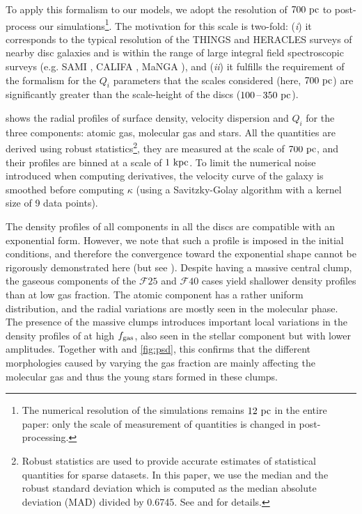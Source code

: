 \documentclass[useAMS,usenatbib]{mnras}
\newcommand{\fgas}{\ensuremath{f_{\rm gas}}\xspace}
\newcommand{\gm}{\ensuremath{\mathcal{F}25}\xspace}
\newcommand{\gl}{\ensuremath{\mathcal{F}40}\xspace}
\begin{document}
To apply this formalism to our models, we adopt the resolution of $700 \mathrm{~pc}$ to post-process our simulations\footnote{The numerical resolution of the simulations remains $12 \mathrm{~pc}$ in the entire paper: only the scale of measurement of quantities is changed in post-processing.}. The motivation for this scale is two-fold: (\emph{i}) it corresponds to the typical resolution of the THINGS and HERACLES surveys of nearby disc galaxies \citep{Walter2008, Leroy2009} and is within the range of large integral field spectroscopic surveys (e.g. SAMI \citealt{Croom2012}, CALIFA \citealt{Sanchez2012}, MaNGA \citealt{Bundy2015}), and (\emph{ii}) it fulfills the requirement of the formalism for the $Q_i$ parameters that the scales considered (here, $700 \mathrm{~pc}$) are significantly greater than the scale-height of the discs ($100\textrm{\,--\,} 350 \mathrm{~pc}$).

 shows the radial profiles of surface density, velocity dispersion and $Q_i$ for the three components: atomic gas, molecular gas and stars. All the quantities are derived using robust statistics\footnote{Robust statistics are used to provide accurate estimates of statistical quantities for sparse datasets. In this paper, we use the median and the robust standard deviation which is computed as the median absolute deviation (MAD) divided by 0.6745. See \citet{Muller2000} and \citet{Romeo2016} for details.}, they are measured at the scale of $700\mathrm{~pc}$, and their profiles are binned at a scale of $1 \mathrm{~kpc}$. To limit the numerical noise introduced when computing derivatives, the velocity curve of the galaxy is smoothed before computing $\kappa$ (using a Savitzky-Golay algorithm with a kernel size of 9 data points). 

The density profiles of all components in all the discs are compatible with an exponential form. However, we note that such a profile is imposed in the initial conditions, and therefore the convergence toward the exponential shape cannot be rigorously demonstrated here (but see \citealt{Elmegreen2013, Struck2019}). Despite having a massive central clump, the gaseous components of the \gm and \gl cases yield shallower density profiles than at low gas fraction. The atomic component has a rather uniform distribution, and the radial variations are mostly seen in the molecular phase. The presence of the massive clumps introduces important local variations in the density profiles of \htwo at high \fgas, also seen in the stellar component but with lower amplitudes. Together with  and \ref{fig:psd}, this confirms that the different morphologies caused by varying the gas fraction are mainly affecting the molecular gas and thus the young stars formed in these clumps.
\end{document}
